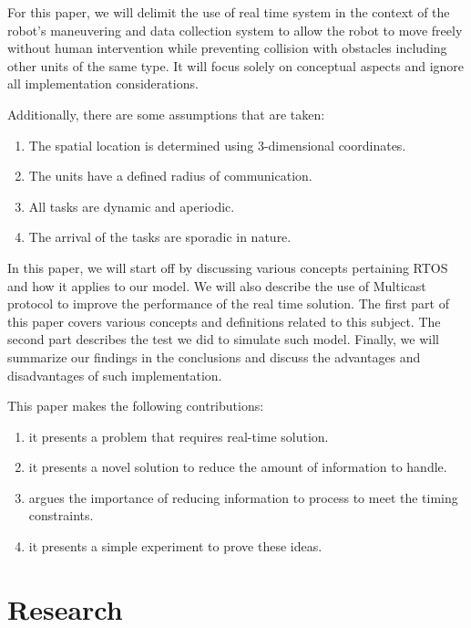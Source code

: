 \documentclass[journal]{IEEEtran}
\begin{document}
For this paper, we will delimit the use of real time system in the context of the robot's maneuvering and data collection system to allow the robot to move freely without human intervention while preventing collision with obstacles including other units of the same type. It will focus solely on conceptual aspects and ignore all implementation considerations. 

Additionally, there are some assumptions that are taken:

\begin{enumerate}
\item The spatial location is determined using 3-dimensional coordinates.
\item The units have a defined radius of communication.
\item All tasks are dynamic and aperiodic.
\item The arrival of the tasks are sporadic in nature.
\end{enumerate}

In this paper, we will start off by discussing various concepts pertaining RTOS and how it applies to our model. We will also describe the use of Multicast protocol to improve the performance of the real time solution. The first part of this paper covers various concepts and definitions related to this subject. The second part describes the test we did to simulate such model. Finally, we will summarize our findings in the conclusions and discuss the advantages and disadvantages of such implementation.

This paper makes the following contributions:
\begin{enumerate}
\item it presents a problem that requires real-time solution.
\item it presents a novel solution to reduce the amount of information to handle.
\item argues the importance of reducing information to process to meet the timing constraints.
\item it presents a simple experiment to prove these ideas.
\end{enumerate}


\section{Research}
\end{document}
